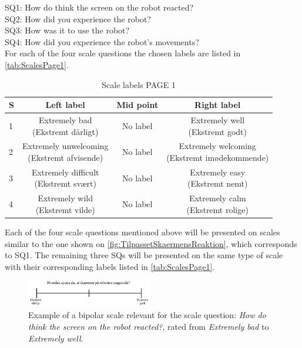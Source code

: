 \noindent
SQ1: How do think the screen on the robot reacted? \\%
SQ2: How did you experience the robot? \\ %
SQ3: How was it to use the robot?\\%
SQ4: How did you experience the robot's movements? \\%
For each of the four scale questions the chosen labels are listed in \autoref{tab:ScalesPage1}.
%
\begin{table}[H]
	\centering
\caption{Scale labels PAGE 1}
	\label{tab:ScalesPage1} 
	\begin{tabular}{l|c|c|c}
		S     & Left label & Mid point & Right label \\\hline
		1   & \makecell{Extremely bad\\(Ekstremt dårligt)}  & No label & \makecell{Extremely well \\(Ekstremt godt)}        \\\hline
		2   & \makecell{Extremely unwelcoming \\(Ekstremt afvisende)} & No label & \makecell{Extremely welcoming \\(Ekstremt imødekommende)}         \\\hline
		3   & \makecell{Extremely difficult \\(Ekstremt svært)} & No label & \makecell{Extremely easy \\(Ekstremt nemt)}         \\\hline
	 	4   & \makecell{Extremely wild \\(Ekstremt vilde)} & No label & \makecell{Extremely calm \\(Ekstremt rolige)}               
	\end{tabular}        
\end{table}
\noindent
%
Each of the four scale questions mentioned above will be presented on scales similar to the one shown on \autoref{fig:TilpassetSkaermensReaktion}, which corresponds to SQ1. The remaining three SQs will be presented on the same type of scale with their corresponding labels listed in \autoref{tab:ScalesPage1}.  
%
\begin{figure}[H]
\centering
\includegraphics[width = 0.49\textwidth]{Figure/TilpassetSkaermensReaktion}
\setlength{} 
\caption{Example of a bipolar scale relevant for the scale question: \textit{How do think the screen on the robot reacted?}, rated from \textit{Extremely bad} to \textit{Extremely well}.}
\label{fig:TilpassetSkaermensReaktion}
\end{figure}
